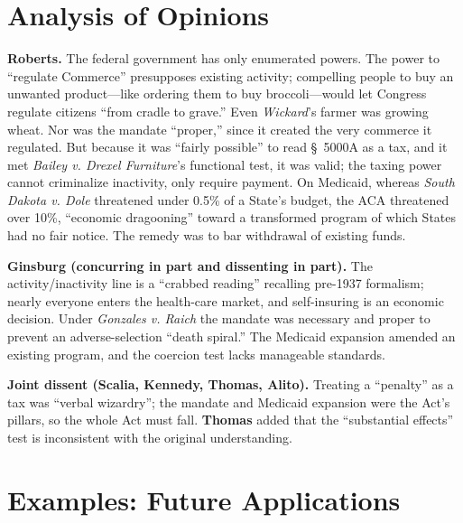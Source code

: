\documentclass[12pt]{article}
\begin{document}
\section{Analysis of Opinions}

\textbf{Roberts.} The federal government has only enumerated powers. The power to ``regulate Commerce'' presupposes existing activity; compelling people to buy an unwanted product---like ordering them to buy broccoli---would let Congress regulate citizens ``from cradle to grave.'' Even \textit{Wickard}'s farmer was growing wheat. Nor was the mandate ``proper,'' since it created the very commerce it regulated. But because it was ``fairly possible'' to read \S~5000A as a tax, and it met \textit{Bailey v. Drexel Furniture}'s functional test, it was valid; the taxing power cannot criminalize inactivity, only require payment. On Medicaid, whereas \textit{South Dakota v. Dole} threatened under 0.5\% of a State's budget, the ACA threatened over 10\%, ``economic dragooning'' toward a transformed program of which States had no fair notice. The remedy was to bar withdrawal of existing funds.

\textbf{Ginsburg (concurring in part and dissenting in part).} The activity/inactivity line is a ``crabbed reading'' recalling pre-1937 formalism; nearly everyone enters the health-care market, and self-insuring is an economic decision. Under \textit{Gonzales v. Raich} the mandate was necessary and proper to prevent an adverse-selection ``death spiral.'' The Medicaid expansion amended an existing program, and the coercion test lacks manageable standards.

\textbf{Joint dissent (Scalia, Kennedy, Thomas, Alito).} Treating a ``penalty'' as a tax was ``verbal wizardry''; the mandate and Medicaid expansion were the Act's pillars, so the whole Act must fall. \textbf{Thomas} added that the ``substantial effects'' test is inconsistent with the original understanding.

\section{Examples: Future Applications}
\end{document}
